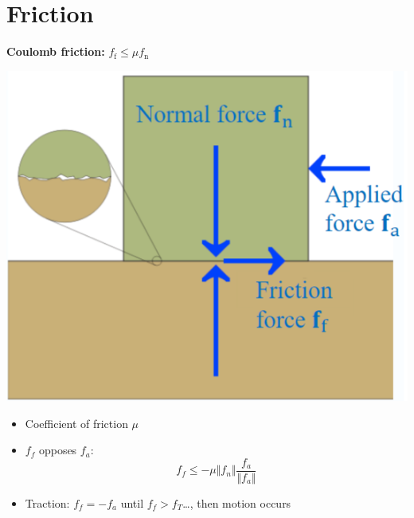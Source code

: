 \documentclass{article}
\begin{document}
\section*{Friction}
\textbf{Coulomb friction:} $f_\text{f} \leq \mu f_\text{n}$
\begin{center}
    \includegraphics*[scale=0.8]{W6_3.png}
\end{center}
\begin{itemize}
    \item Coefficient of friction $\mu$
    \item $f_f$ opposes $f_a$:
    \[f_f \leq -\mu \Vert f_n\Vert \frac{f_a}{\Vert f_a \Vert}\]
    \item Traction: $f_f = -f_a$ until $f_f > f_T$\dots, then motion occurs
\end{itemize}
\end{document}
